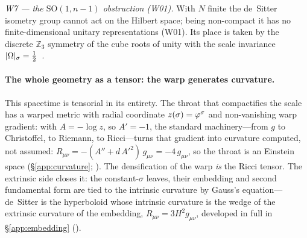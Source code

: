 \emph{W7 --- the $\mathrm{SO}(1,n{-}1)$ obstruction (W01).} With $N$ finite the de~Sitter
isometry group cannot act on the Hilbert space; being non-compact it has no
finite-dimensional unitary representations (W01). Its place is taken by the discrete
$\mathbb{Z}_3$ symmetry of the cube roots of unity with the scale invariance
$|\Omega|_\sigma=\tfrac12$~\cite{Witten01dS}.


\paragraph{The whole geometry as a tensor: the warp generates curvature.}
This spacetime is tensorial in its entirety. The throat that compactifies the scale has a
warped metric with radial
coordinate $z(\sigma)=\varphi^{\sigma}$ and non-vanishing warp gradient: with $A=-\log z$, so
$A'=-1$, the standard machinery---from $g$ to Christoffel, to Riemann, to Ricci---turns that
gradient into curvature computed, not assumed:
$R_{\mu\nu}=-(A''+d\,A'^2)\,g_{\mu\nu}=-4\,g_{\mu\nu}$, so the throat is an Einstein space
(\S\ref{app:curvature}; ). The densification of
the warp \emph{is} the Ricci tensor. The extrinsic side closes it: the constant-$\sigma$
leaves, their embedding and second fundamental form are tied to the intrinsic curvature by
Gauss's equation---de~Sitter is the hyperboloid whose intrinsic curvature is the wedge of
the extrinsic curvature of the embedding, $R_{\mu\nu}=3H^2 g_{\mu\nu}$, developed in full in
\S\ref{app:embedding} ().

